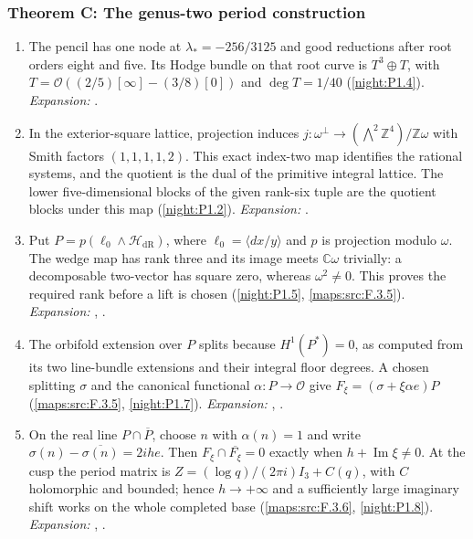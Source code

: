 \subsubsection*{Theorem C: The genus-two period construction}
\begin{enumerate}[label=\arabic*.,leftmargin=*]
\item\hypertarget{step-V-C-1}{} The pencil has one node at $\lambda_*=-256/3125$ and good
  reductions after root orders eight and five.  Its Hodge bundle on
  that root curve is $T^3\oplus T$, with
  $T=\mathcal O((2/5)[\infty]-(3/8)[0])$ and
  $\deg T=1/40$ (\cref{night:P1.4}).
\textit{Expansion:} .
\item\hypertarget{step-V-C-2}{} In the exterior-square lattice, projection induces
  $j:\omega^\perp\to(\bigwedge^2\mathbb Z^4)/\mathbb Z\omega$
  with Smith factors $(1,1,1,1,2)$.  This exact index-two map identifies
  the rational systems, and the quotient is the dual of the primitive
  integral lattice.  The lower five-dimensional blocks of the given
  rank-six tuple are the quotient blocks under this map
  (\cref{night:P1.2}).
\textit{Expansion:} .
\item\hypertarget{step-V-C-3}{} Put $P=p(\ell_0\wedge\mathcal H_{\mathrm{dR}})$, where
  $\ell_0=\langle dx/y\rangle$ and $p$ is projection modulo $\omega$.
  The wedge map has rank three and its image meets $\mathbb C\omega$
  trivially: a decomposable two-vector has square zero, whereas
  $\omega^2\ne0$.  This proves the required rank before a lift is
  chosen (\cref{night:P1.5}, \cref{maps:src:F.3.5}).
\textit{Expansion:} , .
\item\hypertarget{step-V-C-4}{} The orbifold extension over $P$ splits because
  $H^1(P^*)=0$, as computed from its two line-bundle extensions and
  their integral floor degrees.  A chosen splitting $\sigma$ and
  the canonical functional $\alpha:P\to\mathcal O$ give
  $F_\xi=(\sigma+\xi\alpha e)P$
  (\cref{maps:src:F.3.5}, \cref{night:P1.7}).
\textit{Expansion:} , .
\item\hypertarget{step-V-C-5}{} On the real line $P\cap\overline P$, choose $n$ with
  $\alpha(n)=1$ and write
  $\sigma(n)-\overline{\sigma(n)}=2ih e$.
  Then $F_\xi\cap\overline{F_\xi}=0$ exactly when
  $h+\operatorname{Im}\xi\ne0$.  At the cusp the period matrix is
  $Z=(\log q)/(2\pi i)I_3+C(q)$, with $C$ holomorphic and bounded;
  hence $h\to+\infty$ and a sufficiently large imaginary shift
  works on the whole completed base
  (\cref{maps:src:F.3.6}, \cref{night:P1.8}).
\textit{Expansion:} , .
\end{enumerate}


